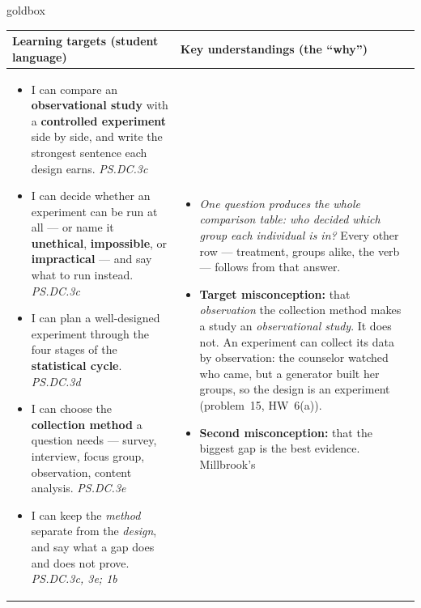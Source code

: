 \documentclass[10pt]{article}
\begin{document}
\renewcommand{\arraystretch}{1.4}
\boxguard
\begin{skillbox}{goldbox}
\begin{tabularx}{\linewidth}{@{}X|X@{}}
\textbf{Learning targets (student language)} & \textbf{Key understandings (the ``why'')} \\[2pt]
\hline
\vspace{-6pt}
\begin{itemize}[leftmargin=1.1em, nosep, after=\vspace{2pt}]
  \item I can compare an \textbf{observational study} with a \textbf{controlled experiment}
        side by side, and write the strongest sentence each design earns.
        \hfill \textit{PS.DC.3c}
  \item I can decide whether an experiment can be run at all --- or name it
        \textbf{unethical}, \textbf{impossible}, or \textbf{impractical} --- and say what to
        run instead. \hfill \textit{PS.DC.3c}
  \item I can plan a well-designed experiment through the four stages of the
        \textbf{statistical cycle}. \hfill \textit{PS.DC.3d}
  \item I can choose the \textbf{collection method} a question needs --- survey, interview,
        focus group, observation, content analysis. \hfill \textit{PS.DC.3e}
  \item I can keep the \emph{method} separate from the \emph{design}, and say what a gap does
        and does not prove. \hfill \textit{PS.DC.3c, 3e; 1b}
\end{itemize}
&
\vspace{-6pt}
\begin{itemize}[leftmargin=1.1em, nosep, after=\vspace{2pt}]
  \item \emph{One question produces the whole comparison table: who decided which group each
        individual is in?} Every other row --- treatment, groups alike, the verb --- follows
        from that answer.
  \item \textbf{Target misconception:} that \emph{observation} the collection method makes a
        study an \emph{observational study}. It does not. An experiment can collect its data by
        observation: the counselor watched who came, but a generator built her groups, so the
        design is an experiment (problem~15, HW~6(a)).
  \item \textbf{Second misconception:} that the biggest gap is the best evidence. Millbrook's

\end{itemize}
\end{tabularx}
\end{skillbox}
\end{document}
